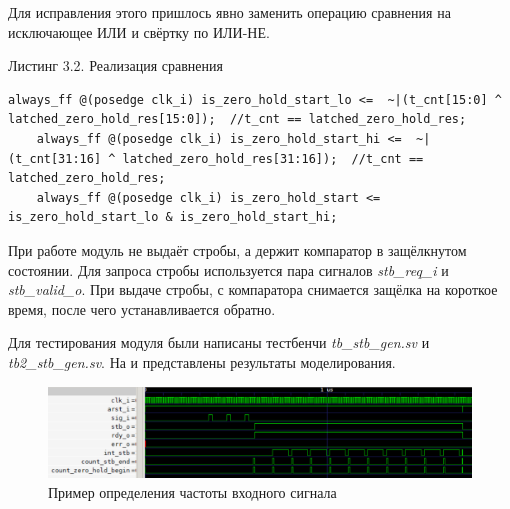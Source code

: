 \FloatBarrier

Для исправления этого пришлось явно заменить операцию сравнения на исключающее ИЛИ и свёртку по ИЛИ-НЕ.

\begin{flushright}
Листинг 3.2. Реализация сравнения
\end{flushright}
\lstset{
	numbersep = 5pt,
	stepnumber = 1
}
\begin{lstlisting}
always_ff @(posedge clk_i) is_zero_hold_start_lo <=  ~|(t_cnt[15:0] ^ latched_zero_hold_res[15:0]);  //t_cnt == latched_zero_hold_res;
	always_ff @(posedge clk_i) is_zero_hold_start_hi <=  ~|(t_cnt[31:16] ^ latched_zero_hold_res[31:16]);  //t_cnt == latched_zero_hold_res;
	always_ff @(posedge clk_i) is_zero_hold_start <= is_zero_hold_start_lo & is_zero_hold_start_hi; 
\end{lstlisting}

При работе модуль не выдаёт стробы, а держит компаратор в защёлкнутом состоянии. Для запроса стробы используется пара сигналов
\emph{stb\_req\_i} и \emph{stb\_valid\_o}. При выдаче стробы, с компаратора снимается защёлка на короткое время, после чего устанавливается обратно.

Для тестирования модуля были написаны тестбенчи \emph{tb\_stb\_gen.sv} и \emph{tb2\_stb\_gen.sv}. На  и 
представлены результаты моделирования.

\begin{figure}[ht!] 
	\center
	\includegraphics  [scale=0.7] {my_folder/images//tb_stb_gen}
	\caption{Пример определения частоты входного сигнала} 
	\label{fig:tb-stb-gen}  
\end{figure}

